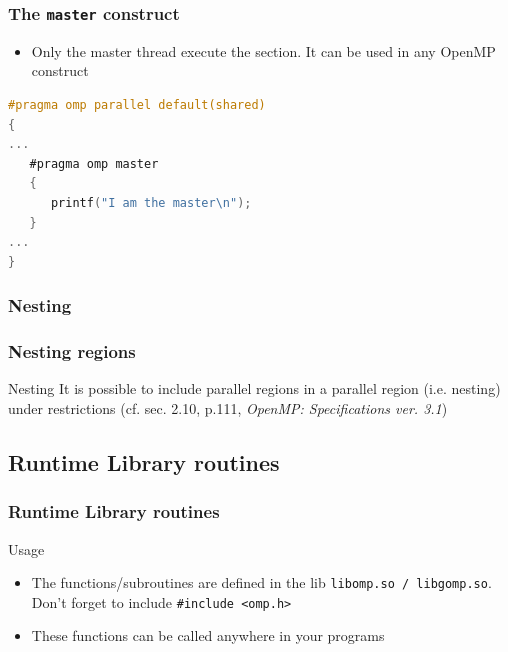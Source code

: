 \begin{frame}[containsverbatim]
\frametitle{The \texttt{master} construct}

\begin{itemize}
        \item{Only the master thread execute the section. It can be used in any OpenMP construct}
\end{itemize}

\begin{lstlisting}[language=C,frame=lines]
#pragma omp parallel default(shared)
{
...
   #pragma omp master
   {
      printf("I am the master\n");
   }
...
}
\end{lstlisting}

\end{frame}

\subsubsection{Nesting}

\begin{frame}
\frametitle{Nesting regions}

\begin{exampleblock}{Nesting}
It is possible to include parallel regions in a parallel region (i.e. nesting) under restrictions (cf. sec. 2.10, p.111, \textit{OpenMP: Specifications ver. 3.1})
\end{exampleblock}


\end{frame}



\subsection{Runtime Library routines}

\begin{frame}
\frametitle{Runtime Library routines}
\begin{exampleblock}{Usage}
\begin{itemize}
\item{The functions/subroutines are defined in the lib \texttt{libomp.so / libgomp.so}. Don't
    forget to include \texttt{\#include <omp.h>}}
\item{These functions can be called anywhere in your programs}
\end{itemize}
\end{exampleblock}
\end{frame}



